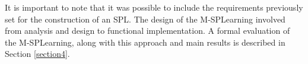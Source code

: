 It is important to note that it was possible to include the requirements previously set for the construction of an SPL. The design of the M-SPLearning involved from analysis and design to functional implementation. A formal evaluation of the M-SPLearning, along with this approach and main results is described in Section \ref{section4}.